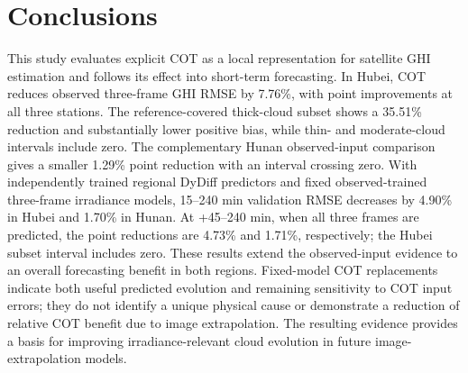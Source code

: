 \documentclass[11pt]{article}
\begin{document}
\section{Conclusions}
This study evaluates explicit COT as a local representation for satellite GHI estimation and follows its effect into short-term forecasting. In Hubei, COT reduces observed three-frame GHI RMSE by 7.76\%, with point improvements at all three stations. The reference-covered thick-cloud subset shows a 35.51\% reduction and substantially lower positive bias, while thin- and moderate-cloud intervals include zero. The complementary Hunan observed-input comparison gives a smaller 1.29\% point reduction with an interval crossing zero. With independently trained regional DyDiff predictors and fixed observed-trained three-frame irradiance models, 15--240 min validation RMSE decreases by 4.90\% in Hubei and 1.70\% in Hunan. At +45--240 min, when all three frames are predicted, the point reductions are 4.73\% and 1.71\%, respectively; the Hubei subset interval includes zero. These results extend the observed-input evidence to an overall forecasting benefit in both regions. Fixed-model COT replacements indicate both useful predicted evolution and remaining sensitivity to COT input errors; they do not identify a unique physical cause or demonstrate a reduction of relative COT benefit due to image extrapolation. The resulting evidence provides a basis for improving irradiance-relevant cloud evolution in future image-extrapolation models.
\FloatBarrier
\end{document}
